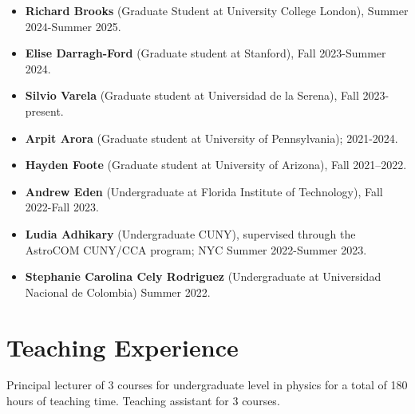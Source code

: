 \documentclass[14pt]{article}
\begin{document}
\begin{itemize}
  \setlength\itemsep{0.0em}
  \renewcommand\labelitemi{$\cdot$}
  \item \textbf{Richard Brooks} (Graduate Student at University College
    London), Summer 2024-Summer 2025.
  \item \textbf{Elise Darragh-Ford} (Graduate student at Stanford), Fall 2023-Summer
    2024.
  \item \textbf{Silvio Varela} (Graduate student at Universidad de la Serena),
    Fall 2023-present.
  \item \textbf{Arpit Arora} (Graduate student at University of Pennsylvania);
    2021-2024. 
  \item \textbf{Hayden Foote} (Graduate student at University of Arizona), Fall
    2021--2022.
  \item \textbf{Andrew Eden} (Undergraduate at Florida Institute of Technology),
    Fall 2022-Fall 2023.  
  \item \textbf{Ludia Adhikary} (Undergraduate CUNY), supervised through the AstroCOM CUNY/CCA program; NYC Summer 2022-Summer 2023. 
  \item \textbf{Stephanie Carolina Cely Rodriguez} (Undergraduate at Universidad
    Nacional de Colombia) Summer 2022. 
\end{itemize}

\section*{Teaching Experience}

Principal lecturer of 3 courses for undergraduate level in physics for a total
of 180 hours of teaching time. Teaching assistant for 3 courses.
\end{document}
